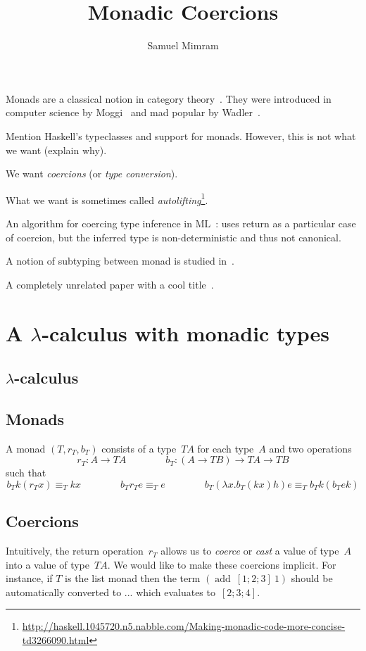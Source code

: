 \documentclass{article}
\title{Monadic Coercions}
\author{Samuel Mimram}
\newcommand{\add}{\mathop{add}}
\begin{document}
\maketitle

Monads are a classical notion in category theory~\cite{mac1998categories}. They
were introduced in computer science by Moggi~\cite{moggi2002computational} and
mad popular by Wadler~\cite{wadler1992comprehending}.

Mention Haskell's typeclasses and support for monads. However, this is not what
we want (explain why).

We want \emph{coercions} (or \emph{type conversion}).

What we want is sometimes called
\emph{autolifting}\footnote{\url{http://haskell.1045720.n5.nabble.com/Making-monadic-code-more-concise-td3266090.html}}.

An algorithm for coercing type inference in ML~\cite{luo2008coercions}: uses
return as a particular case of coercion, but the inferred type is
non-deterministic and thus not canonical.

A notion of subtyping between monad is studied in~\cite{tolmach1998optimizing}.

A completely unrelated paper with a cool title~\cite{shalgi2008being}.


\section{A $\lambda$-calculus with monadic types}

\subsection{$\lambda$-calculus}

\subsection{Monads}
A monad $(T,r_T,b_T)$ consists of a type~$TA$ for each type~$A$ and two
operations
\[
r_T:A\to TA
\qquad\qquad
b_T:(A\to TB)\to TA\to TB
\]
such that
\begin{equation}
  \label{eq:monad-laws}
  b_Tk(r_T x)\equiv_T kx
  \qquad\qquad
  b_Tr_Te\equiv_T e
  \qquad\qquad
  b_T(\lambda x.b_T(kx)h)e\equiv_T b_Tk(b_T e k)
\end{equation}

\subsection{Coercions}
Intuitively, the return operation~$r_T$ allows us to \emph{coerce} or
\emph{cast} a value of type~$A$ into a value of type~$TA$. We would like to make
these coercions implicit. For instance, if $T$ is the list monad then the term
$(\add\ [1;2;3]\ 1)$ should be automatically converted to ... which evaluates
to~$[2;3;4]$.
\end{document}
